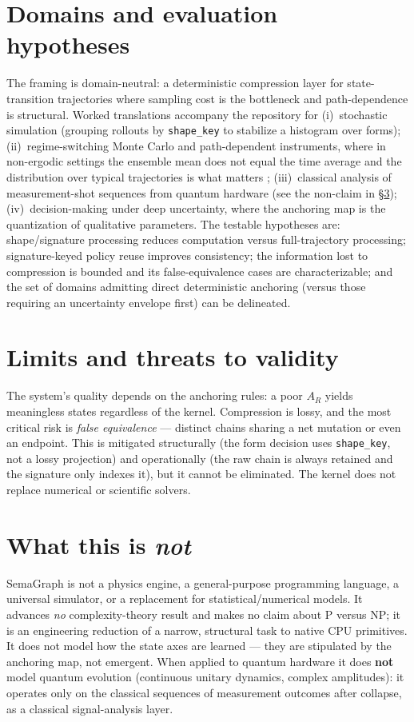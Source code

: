 \documentclass[11pt,a4paper]{article}
\begin{document}
\section{Domains and evaluation hypotheses}
The framing is domain-neutral: a deterministic compression layer for
state-transition trajectories where sampling cost is the bottleneck and
path-dependence is structural. Worked translations accompany the repository for
(i)~stochastic simulation (grouping rollouts by \texttt{shape\_key} to stabilize a
histogram over forms); (ii)~regime-switching Monte Carlo and path-dependent
instruments, where in non-ergodic settings the ensemble mean does not equal the
time average and the distribution over typical trajectories is what matters
\cite{peters2019,hamilton1989}; (iii)~classical analysis of measurement-shot
sequences from quantum hardware (see the non-claim in \S\ref{sec:not});
(iv)~decision-making under deep uncertainty, where the anchoring map is the
quantization of qualitative parameters. The testable hypotheses are: shape/signature
processing reduces computation versus full-trajectory processing; signature-keyed
policy reuse improves consistency; the information lost to compression is bounded
and its false-equivalence cases are characterizable; and the set of domains
admitting direct deterministic anchoring (versus those requiring an uncertainty
envelope first) can be delineated.

\section{Limits and threats to validity}
The system's quality depends on the anchoring rules: a poor $A_R$ yields
meaningless states regardless of the kernel. Compression is lossy, and the most
critical risk is \emph{false equivalence} --- distinct chains sharing a net mutation
or even an endpoint. This is mitigated structurally (the form decision uses
\texttt{shape\_key}, not a lossy projection) and operationally (the raw chain is
always retained and the signature only indexes it), but it cannot be eliminated.
The kernel does not replace numerical or scientific solvers.

\section{What this is \emph{not}}\label{sec:not}
SemaGraph is not a physics engine, a general-purpose programming language, a
universal simulator, or a replacement for statistical/numerical models. It advances
\emph{no} complexity-theory result and makes no claim about P versus NP; it is an
engineering reduction of a narrow, structural task to native CPU primitives. It
does not model how the state axes are learned --- they are stipulated by the
anchoring map, not emergent. When applied to quantum hardware it does \textbf{not}
model quantum evolution (continuous unitary dynamics, complex amplitudes): it
operates only on the classical sequences of measurement outcomes after collapse,
as a classical signal-analysis layer.
\end{document}
